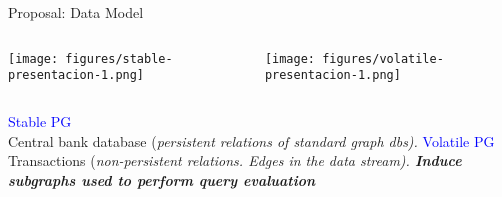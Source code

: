 \begin{comment}
\begin{frame}{Proposal: Data Model}

\begin{itemize}
\item Nature of our data: ATM transactions on a bank system.
\vspace{2em}
\pause
\item \textbf{\emph{Continuously evolving database}} - data can be stable and volatile.
\begin{itemize}
    \vspace{0.5em}
    \item[$\Rightarrow$] Graph Data Model: Property Graph (PG).
    \vspace{1em}
    \item[$\Rightarrow$] Graph Database System: Neo4j (based on PG).
\end{itemize}
\end{itemize}
\end{frame}
\end{comment}

\begin{frame}{Proposal: Data Model}
    \begin{columns}
        \begin{center}
            \texttt{[image: figures/stable-presentacion-1.png]}  
        \end{center}

        \begin{center} 
            \texttt{[image: figures/volatile-presentacion-1.png]}
        \end{center}
    \end{columns}
    \vspace{0.6em}
    \begin{columns}
        \hspace{4.7em}\textcolor{blue}{Stable PG} \\Central bank database 
        {\small(\emph{persistent relations of standard graph dbs).}}
        \hspace{4.7em}
        \textcolor{blue}{Volatile PG} \\
        \vspace{0.3em}
        Transactions 
        {\small(\emph{non-persistent relations. Edges in the data stream).
        \textbf{Induce subgraphs used to perform query evaluation}}}
    \end{columns}
    
\end{frame}


